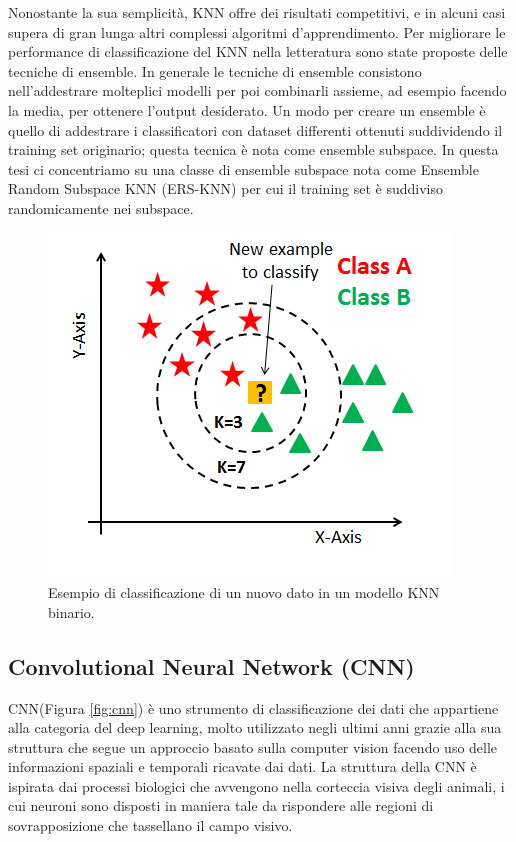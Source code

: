 Nonostante la sua semplicità, KNN offre dei risultati competitivi, e in alcuni casi supera di gran lunga altri complessi algoritmi d'apprendimento. Per migliorare le performance di classificazione del KNN nella letteratura sono state proposte delle tecniche di ensemble. In generale le tecniche di ensemble consistono nell'addestrare molteplici modelli per poi combinarli assieme, ad esempio facendo la media, per ottenere l'output desiderato. Un modo per creare un ensemble è quello di addestrare i classificatori con dataset differenti ottenuti suddividendo il training set originario; 
questa tecnica è nota come ensemble subspace. In questa tesi ci concentriamo su una classe di ensemble subspace nota come Ensemble Random Subspace KNN (ERS-KNN) per cui il training set è suddiviso randomicamente nei subspace.

\begin{figure}[!htb]
    \centering
    \includegraphics[width=.5\textwidth]{figure/knn.png}
    \caption{Esempio di classificazione di un nuovo dato in un modello KNN binario.}
    \label{fig:knn}
\end{figure}

\subsection{Convolutional Neural Network (CNN)}
\label{ssec:cnn}

CNN(Figura \ref{fig:cnn}) è uno strumento di classificazione dei dati che appartiene alla categoria del deep learning, molto utilizzato negli ultimi anni grazie alla sua struttura che segue un approccio basato sulla computer vision facendo uso delle informazioni spaziali e temporali ricavate dai dati. La struttura della CNN è ispirata dai processi biologici che avvengono nella corteccia visiva degli animali, i cui neuroni sono disposti in maniera tale da rispondere alle regioni di sovrapposizione che tassellano il campo visivo.

